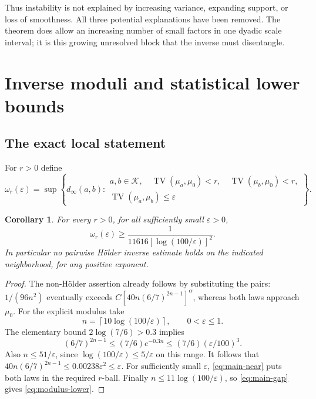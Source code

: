 \documentclass[11pt,a4paper]{article}
\newtheorem{corollary}[theorem]{Corollary}
\theoremstyle{definition}
\theoremstyle{remark}
\DeclareMathOperator{\TV}{TV}
\newcommand{\K}{\mathcal K}
\newcommand{\eps}{\varepsilon}
\begin{document}
Thus instability is not explained by increasing variance, expanding
support, or loss of smoothness. All three potential explanations have
been removed. The theorem does allow an increasing number of small
factors in one dyadic scale interval; it is this growing unresolved block
that the inverse must disentangle.

\section{Inverse moduli and statistical lower bounds}
\label{sec:consequences}

\subsection{The exact local statement}

For $r>0$ define
\begin{equation}\label{eq:modulus}
 \omega_r(\eps)=\sup\left\{d_\infty(a,b):
 \begin{array}{l}
 a,b\in\K,\quad\TV(\mu_a,\mu_0)<r,\quad\TV(\mu_b,\mu_0)<r,\\
 \TV(\mu_a,\mu_b)\le\eps
 \end{array}\right\}.
\end{equation}

\begin{corollary}\label{cor:modulus}
For every $r>0$, for all sufficiently small $\eps>0$,
\begin{equation}\label{eq:modulus-lower}
 \omega_r(\eps)\ge\frac1{11616[\log(100/\eps)]^2}.
\end{equation}
In particular no pairwise H\"older inverse estimate holds on the indicated
neighborhood, for any positive exponent.
\end{corollary}

\begin{proof}
The non-H\"older assertion already follows by substituting the pairs:
$1/(96n^2)$ eventually exceeds
$C[40n(6/7)^{2n-1}]^\alpha$, whereas both laws approach $\mu_0$.
For the explicit modulus take
\[
 n=\left\lceil10\log(100/\eps)\right\rceil,\qquad0<\eps\le1.
\]
The elementary bound $2\log(7/6)>0.3$ implies
\[
 (6/7)^{2n-1}\le(7/6)e^{-0.3n}
                   \le(7/6)(\eps/100)^3.
\]
Also $n\le51/\eps$, since $\log(100/\eps)\le5/\eps$ on this range.
It follows that $40n(6/7)^{2n-1}\le0.00238\eps^2\le\eps$.
For sufficiently small $\eps$, \eqref{eq:main-near} puts both laws in
the required $r$-ball. Finally
$n\le11\log(100/\eps)$, so \eqref{eq:main-gap} gives
\eqref{eq:modulus-lower}.
\end{proof}
\end{document}
